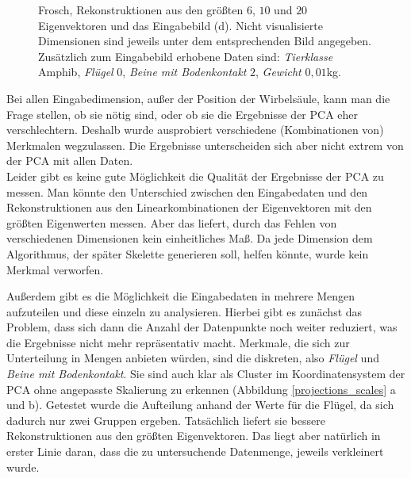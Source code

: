 \begin{figure}
  \qquad
  
  \caption{Frosch, Rekonstruktionen aus den größten $6$, $10$ und $20$ Eigenvektoren und das Eingabebild (d). Nicht visualisierte Dimensionen sind jeweils unter dem entsprechenden Bild angegeben. Zusätzlich zum Eingabebild erhobene Daten sind:
  \emph{Tierklasse} Amphib, \emph{Flügel} $0$, \emph{Beine mit Bodenkontakt} $2$, \emph{Gewicht} $0,01$kg.}
  \label{frosch}
 \end{figure}

 Bei allen Eingabedimension, außer der Position der Wirbelsäule, kann man die Frage stellen, ob sie nötig sind, oder ob sie die Ergebnisse der PCA eher verschlechtern. Deshalb wurde ausprobiert verschiedene (Kombinationen von) Merkmalen wegzulassen. Die Ergebnisse unterscheiden sich aber nicht extrem von der PCA mit allen Daten. \\
 Leider gibt es keine gute Möglichkeit die Qualität der Ergebnisse der PCA zu messen. Man könnte den Unterschied zwischen den Eingabedaten und den Rekonstruktionen aus den Linearkombinationen der Eigenvektoren mit den größten Eigenwerten messen. Aber das liefert, durch das Fehlen von verschiedenen Dimensionen kein einheitliches Maß.
 Da jede Dimension dem Algorithmus, der später Skelette generieren soll, helfen könnte, wurde kein Merkmal verworfen.
 
 Außerdem gibt es die Möglichkeit die Eingabedaten in mehrere Mengen aufzuteilen und diese einzeln zu analysieren. Hierbei gibt es zunächst das Problem, dass sich dann die Anzahl der Datenpunkte noch weiter reduziert, was die Ergebnisse nicht mehr repräsentativ macht.
 Merkmale, die sich zur Unterteilung in Mengen anbieten würden, sind die diskreten, also \emph{Flügel} und \emph{Beine mit Bodenkontakt}. Sie sind auch klar als Cluster im Koordinatensystem der PCA ohne angepasste Skalierung zu erkennen (Abbildung \ref{projections_scales} a und b).
 Getestet wurde die Aufteilung anhand der Werte für die Flügel, da sich dadurch nur zwei Gruppen ergeben. Tatsächlich liefert sie bessere Rekonstruktionen aus den größten Eigenvektoren. Das liegt aber natürlich in erster Linie daran, dass die zu untersuchende Datenmenge, jeweils verkleinert wurde.
 
